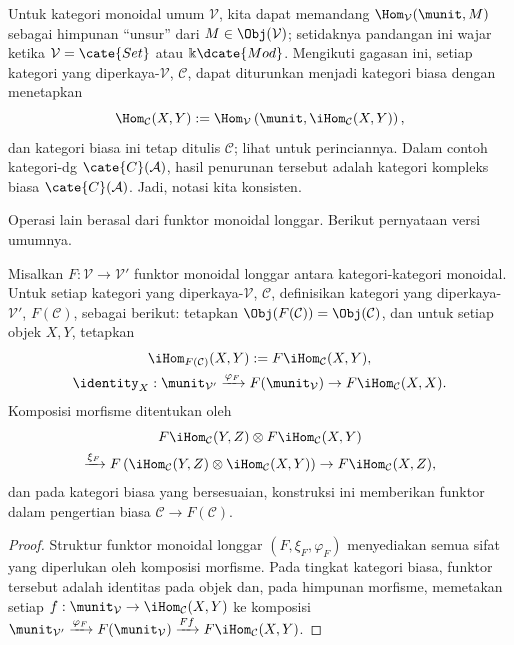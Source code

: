 Untuk kategori monoidal umum $\mathcal{V}$, kita dapat memandang
$\Hom_{\mathcal{V}}(\munit,M)$ sebagai himpunan ``unsur'' dari
$M\in\Obj(\mathcal{V})$; setidaknya pandangan ini wajar ketika
$\mathcal{V}=\cate{Set}$ atau $\Bbbk\dcate{Mod}$. Mengikuti gagasan ini,
setiap kategori yang diperkaya-$\mathcal{V}$, $\mathcal{C}$, dapat diturunkan
menjadi kategori biasa dengan menetapkan
\[ \Hom_{\mathcal{C}}(X, Y) := \Hom_{\mathcal{V}}\left( \munit, \iHom_{\mathcal{C}}(X, Y) \right), \]
dan kategori biasa ini tetap ditulis $\mathcal{C}$; lihat
\cite[Catatan 3.4.3]{Li1} untuk perinciannya. Dalam contoh kategori-dg
$\cate{C}(\mathcal{A})$, hasil penurunan tersebut adalah kategori kompleks
biasa $\cate{C}(\mathcal{A})$. Jadi, notasi kita konsisten.

Operasi lain berasal dari funktor monoidal longgar. Berikut pernyataan versi
umumnya.

\begin{proposition}\label{prop:lax-monoidal-enriched}
	Misalkan $F:\mathcal{V}\to\mathcal{V}'$ funktor monoidal longgar antara
	kategori-kategori monoidal. Untuk setiap kategori yang
	diperkaya-$\mathcal{V}$, $\mathcal{C}$, definisikan kategori yang
	diperkaya-$\mathcal{V}'$, $F(\mathcal{C})$, sebagai berikut: tetapkan
	$\Obj(F(\mathcal{C}))=\Obj(\mathcal{C})$, dan untuk setiap objek $X,Y$,
	tetapkan
	\begin{gather*}
		\iHom_{F(\mathcal{C})}(X, Y) := F\iHom_{\mathcal{C}}(X, Y), \\
		\identity_X: \munit_{\mathcal{V}'} \xrightarrow{\varphi_F} F(\munit_{\mathcal{V}}) \to F\iHom_{\mathcal{C}}(X, X).
	\end{gather*}
	Komposisi morfisme ditentukan oleh
	\begin{multline*}
		F\iHom_{\mathcal{C}}(Y, Z) \otimes F\iHom_{\mathcal{C}}(X, Y) \\
		\xrightarrow{\xi_F} F\left( \iHom_{\mathcal{C}}(Y, Z) \otimes \iHom_{\mathcal{C}}(X, Y) \right)
		\to F\iHom_{\mathcal{C}}(X, Z),
	\end{multline*}
	dan pada kategori biasa yang bersesuaian, konstruksi ini memberikan
	funktor dalam pengertian biasa $\mathcal{C}\to F(\mathcal{C})$.
\end{proposition}
\begin{proof}
	Struktur funktor monoidal longgar $(F,\xi_F,\varphi_F)$ menyediakan semua
	sifat yang diperlukan oleh komposisi morfisme. Pada tingkat kategori biasa,
	funktor tersebut adalah identitas pada objek dan, pada himpunan morfisme,
	memetakan setiap $f:\munit_{\mathcal{V}}\to
	\iHom_{\mathcal{C}}(X,Y)$ ke komposisi
	$\munit_{\mathcal{V}'}\xrightarrow{\varphi_F}F(\munit_{\mathcal{V}})
	\xrightarrow{Ff}F\iHom_{\mathcal{C}}(X,Y)$.
\end{proof}

